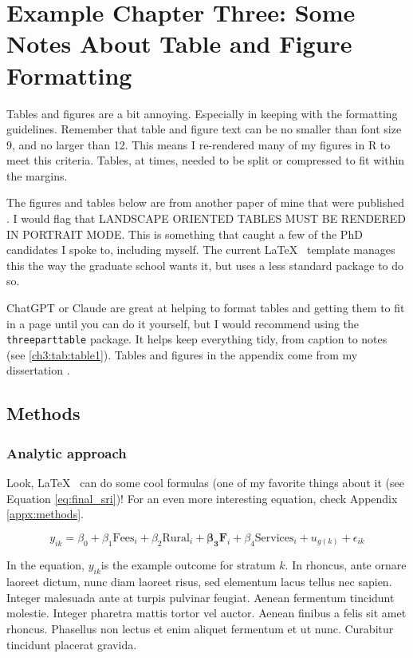 \chapter{Example Chapter Three: Some Notes About Table and Figure Formatting}


\noindent Tables and figures are a bit annoying. Especially in keeping with the formatting guidelines. Remember that table and figure text can be no smaller than font size 9, and no larger than 12. This means I re-rendered many of my figures in R to meet this criteria. Tables, at times, needed to be split or compressed to fit within the margins.

The figures and tables below are from another paper of mine that were published \autocite{rozelle_user_2026}. I would flag that LANDSCAPE ORIENTED TABLES MUST BE RENDERED IN PORTRAIT MODE. This is something that caught a few of the PhD candidates I spoke to, including myself. The current \LaTeX~ template manages this the way the graduate school wants it, but uses a less standard package to do so.

ChatGPT or Claude are great at helping to format tables and getting them to fit in a page until you can do it yourself, but I would recommend using the \texttt{threeparttable} package. It helps keep everything tidy, from caption to notes (see \ref{ch3:tab:table1}). Tables and figures in the appendix come from my dissertation \autocite{rozelle_measuring_2026}.

\section{Methods}

\subsection{Analytic approach}

Look, \LaTeX~ can do some cool formulas (one of my favorite things about it (see Equation \ref{eq:final_sri})! For an even more interesting equation, check Appendix \ref{appx:methods}.

\begin{equation}
    \label{eq:final_sri}
    y_{ik} = \beta_0 + \beta_{1}\text{Fees}_{i} + \beta_{2}\text{Rural}_{i} + \boldsymbol{\beta_{3}}\mathbf{F}_{i} + \beta_{4}\text{Services}_{i} + u_{g(k)} + \epsilon_{ik}
\end{equation}

\noindent In the equation, $y_{ik}$is the example outcome for stratum $k$.  In rhoncus, ante ornare laoreet dictum, nunc diam laoreet risus, sed elementum lacus tellus nec sapien. Integer malesuada ante at turpis pulvinar feugiat. Aenean fermentum tincidunt molestie. Integer pharetra mattis tortor vel auctor. Aenean finibus a felis sit amet rhoncus. Phasellus non lectus et enim aliquet fermentum et ut nunc. Curabitur tincidunt placerat gravida.

